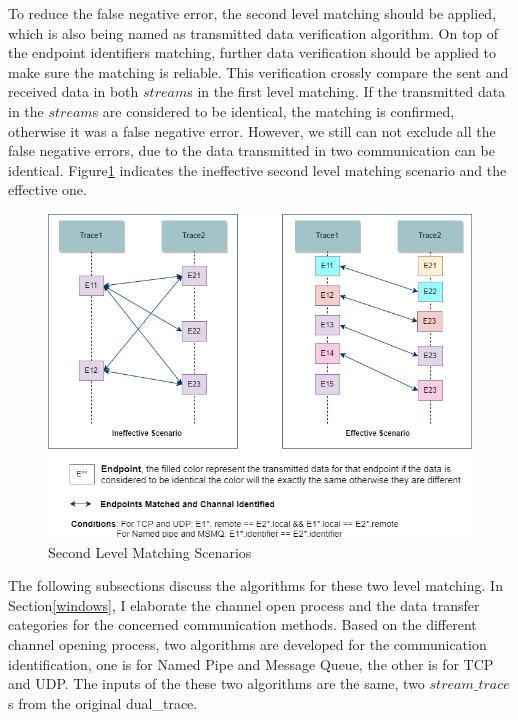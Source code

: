 To reduce the false negative error, the second level matching should be applied, which is also being named as transmitted data verification algorithm. On top of the endpoint identifiers matching, further data verification should be applied to make sure the matching is reliable. This verification crossly compare the sent and received data in both $stream$s in the first level matching. If the transmitted data in the $stream$s are considered to be identical, the matching is confirmed, otherwise it was a false negative error. However, we still can not exclude all the false negative errors, due to the data transmitted in two communication can be identical. Figure\ref{secondlevelmatching} indicates the ineffective second level matching scenario and the effective one.

\begin{figure}[H]
\centerline{\includegraphics[scale=0.55]{Figures/secondlevelmatching}}
 \caption{Second Level Matching Scenarios}
\label{secondlevelmatching}
\end{figure}


The following subsections discuss the algorithms for these two level matching. In Section\ref{windows}, I elaborate the channel open process and the data transfer categories for the concerned communication methods. Based on the different channel opening process, two algorithms are developed for the communication identification, one is for Named Pipe and Message Queue, the other is for TCP and UDP. The inputs of the these two algorithms are the same, two $stream\_trace$s from the original dual\_trace.

